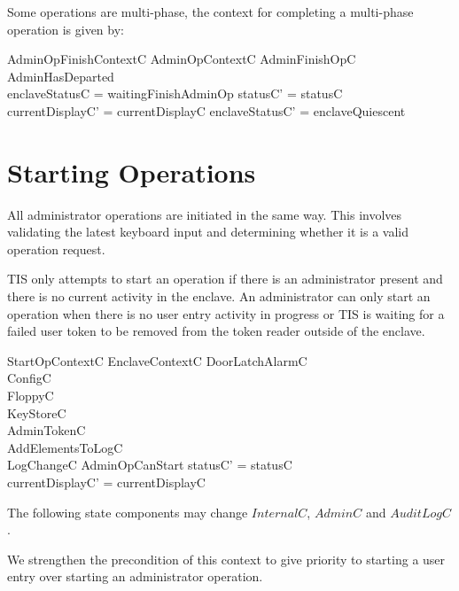 Some operations are multi-phase, the context for completing a
multi-phase operation is given by: 

\begin{schema}{AdminOpFinishContextC}
        AdminOpContextC
\also
        AdminFinishOpC
\where
        \lnot AdminHasDeparted
\\      enclaveStatusC = waitingFinishAdminOp
\also
        statusC' = statusC
\\      currentDisplayC' = currentDisplayC
\also
        enclaveStatusC' = enclaveQuiescent
\end{schema}


\section{Starting Operations}


All administrator operations are initiated in the same way. This
involves validating the latest keyboard input and determining whether
it is a valid operation request.

TIS only attempts to start an operation if there is an administrator
present and there is no current activity in the enclave.
An administrator can only start an operation when there is no user
entry activity in progress or TIS is waiting for a failed user token 
to be removed from the token reader outside of the enclave.

\begin{schema}{StartOpContextC}
        EnclaveContextC
\also
        \Xi DoorLatchAlarmC
\\      \Xi ConfigC
\\      \Xi FloppyC
\\      \Xi KeyStoreC
\\      \Xi AdminTokenC
\\      AddElementsToLogC
\\      LogChangeC
\where
        AdminOpCanStart        
\also
        statusC' = statusC
\\      currentDisplayC' = currentDisplayC
\end{schema}
\begin{Zcomment}
\item
The following state components may change  
$InternalC$, $AdminC$ and $AuditLogC$. 
\item
We strengthen the precondition of this context to give priority to
starting a
user entry over starting an administrator operation.
\end{Zcomment}

